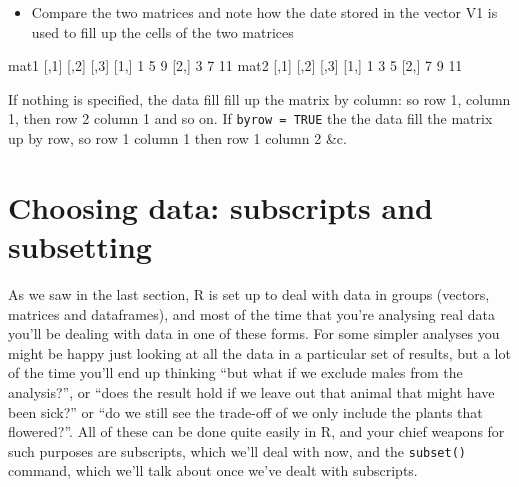 \documentclass[
]{book}
\newenvironment{Shaded}{\begin{snugshade}}{\end{snugshade}}
\newcommand{\DecValTok}[1]{\textcolor[rgb]{0.00,0.00,0.81}{#1}}
\newcommand{\NormalTok}[1]{#1}
\providecommand{\tightlist}{%
  \setlength{\itemsep}{0pt}\setlength{\parskip}{0pt}}
\begin{document}
\begin{itemize}
\tightlist
\item
  Compare the two matrices and note how the date stored in the vector V1 is used to fill up the cells of the two matrices
\end{itemize}

\begin{Shaded}
\begin{Highlighting}[]
\NormalTok{mat1}
\NormalTok{     [,}\DecValTok{1}\NormalTok{] [,}\DecValTok{2}\NormalTok{] [,}\DecValTok{3}\NormalTok{]}
\NormalTok{[}\DecValTok{1}\NormalTok{,]    }\DecValTok{1}    \DecValTok{5}    \DecValTok{9}
\NormalTok{[}\DecValTok{2}\NormalTok{,]    }\DecValTok{3}    \DecValTok{7}   \DecValTok{11}
\NormalTok{mat2       }
\NormalTok{     [,}\DecValTok{1}\NormalTok{] [,}\DecValTok{2}\NormalTok{] [,}\DecValTok{3}\NormalTok{]}
\NormalTok{[}\DecValTok{1}\NormalTok{,]    }\DecValTok{1}    \DecValTok{3}    \DecValTok{5}
\NormalTok{[}\DecValTok{2}\NormalTok{,]    }\DecValTok{7}    \DecValTok{9}   \DecValTok{11}
\end{Highlighting}
\end{Shaded}

If nothing is specified, the data fill fill up the matrix by column: so row 1, column 1, then row 2 column 1 and so on. If \texttt{byrow\ =\ TRUE} the the data fill the matrix up by row, so row 1 column 1 then row 1 column 2 \&c.

\hypertarget{choosing-data-subscripts-and-subsetting}{%
\chapter{Choosing data: subscripts and subsetting}\label{choosing-data-subscripts-and-subsetting}}

As we saw in the last section, R is set up to deal with data in groups (vectors, matrices and dataframes), and most of the time that you're analysing real data you'll be dealing with data in one of these forms. For some simpler analyses you might be happy just looking at all the data in a particular set of results, but a lot of the time you'll end up thinking ``but what if we exclude males from the analysis?'', or ``does the result hold if we leave out that animal that might have been sick?'' or ``do we still see the trade-off of we only include the plants that flowered?''. All of these can be done quite easily in R, and your chief weapons for such purposes are subscripts, which we'll deal with now, and the \texttt{subset()} command, which we'll talk about once we've dealt with subscripts.
\end{document}
